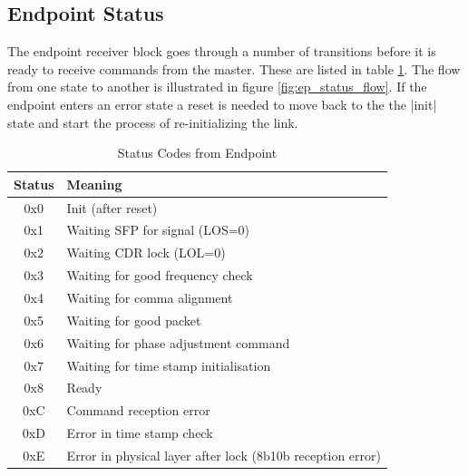 \documentclass{dune}
\begin{document}
\subsection{Endpoint Status}

The endpoint receiver block goes through a number of transitions before it is ready to receive commands from the master. These are listed in table \ref{tab:ep_status}. The flow from one state to another is illustrated in figure \ref{fig:ep_status_flow}. If the endpoint enters an error state a reset is needed to move back to the the |init| state and start the process of re-initializing the link.

\begin{table}[h!]
    \centering
    \begin{tabular}{c|l} \toprule
        Status & Meaning \\ \midrule
        0x0 & Init (after reset)\\
        0x1 & Waiting SFP for signal (LOS=0)\\
        0x2 & Waiting CDR lock (LOL=0)\\
        0x3 & Waiting for good frequency check\\
        0x4 & Waiting for comma alignment\\
        0x5 & Waiting for good packet\\
        0x6 & Waiting for phase adjustment command\\
        0x7 & Waiting for time stamp initialisation\\
        0x8 & Ready\\
        0xC & Command reception error\\
        0xD & Error in time stamp check\\
        0xE & Error in physical layer after lock (8b10b reception error)\\
         \bottomrule
    \end{tabular}
    \caption{Status Codes from Endpoint}
    \label{tab:ep_status}
\end{table}
\end{document}
